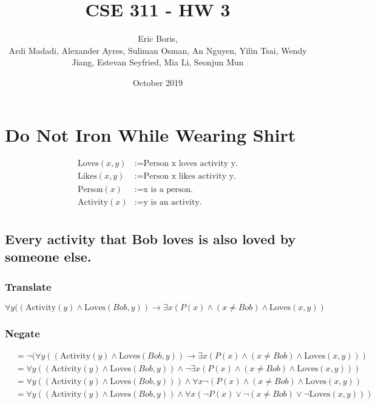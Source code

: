 \documentclass[11pt]{article}
\title{CSE 311 - HW 3}
\author{Eric Boris, \\Ardi Madadi, Alexander Ayres, Suliman Osman, An Nguyen, Yilin Tsai, Wendy Jiang, Estevan Seyfried, Mia Li, Seonjun Mun}
\date{October 2019}
\makeatletter
\renewcommand{\maketitle}{\bgroup\setlength{\parindent}{0pt}
\begin{flushleft}
  \textbf{\@title}

  \@author
  
  \@date
\end{flushleft}\egroup
}
\def\imp{\rightarrow}
\makeatother
\begin{document}
\maketitle

\section{Do Not Iron While Wearing Shirt} %
\begin{align*}
	\text{Loves}(x, y) &:= \text{Person x loves activity y.} \\
	\text{Likes}(x, y) &:= \text{Person x likes activity y.} \\
	\text{Person}(x) &:= \text{x is a person.} \\
	\text{Activity}(x) &:= \text{y is an activity.} \\
\end{align*}

\subsection{Every activity that Bob loves is also loved by someone else.} 
\subsubsection{Translate}
$\forall y ((\text{Activity}(y) \land \text{Loves}(Bob, y)) \imp \exists x(P(x) \land (x \neq Bob) \land \text{Loves}(x, y))$

\subsubsection{Negate}
\begin{align*}
	&= \neg (\forall y ((\text{Activity}(y) \land \text{Loves}(Bob, y)) \imp \exists x(P(x) \land (x \neq Bob) \land \text{Loves}(x, y))) \tag*{Given} \\
	&= \forall y ((\text{Activity}(y) \land \text{Loves}(Bob, y)) \land \neg \exists x(P(x) \land (x \neq Bob) \land \text{Loves}(x, y))) \tag*{Negate Implication} \\
	&= \forall y ((\text{Activity}(y) \land \text{Loves}(Bob, y))) \land \forall x \neg (P(x) \land (x \neq Bob) \land \text{Loves}(x, y)) \tag*{Negate Quantifier} \\
	&= \forall y ((\text{Activity}(y) \land \text{Loves}(Bob, y)) \land \forall x(\neg P(x) \lor \neg (x \neq Bob) \lor \neg \text{Loves}(x, y))) \tag*{DeMorgan's} \\
\end{align*}
\end{document}
